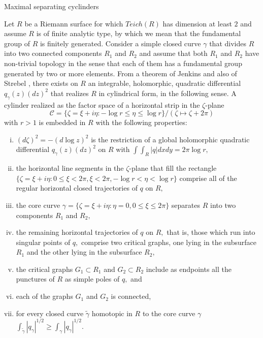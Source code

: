 \documentclass[12pt]{amsart}
\theoremstyle{remark}
\theoremstyle{definition}
\theoremstyle{definition}
\begin{document}
\begin{section}{Maximal separating cyclinders}\label{separating}

Let $R$ be a Riemann surface for which $Teich(R)$ has dimension at least $2$ and assume  $R$ is of finite analytic type, by which we mean that the fundamental group of $R$ is finitely generated.
Consider a simple closed curve $\gamma$  that divides $R$ into two connected components $R_1$ and $R_2$ and assume that both $R_1$ and $R_2$ have non-trivial topology in the sense that each of them has a fundamental group generated by two or more elements.
From a theorem of Jenkins \cite{Jenkins1} and also of Strebel \cite{Strebelbook}, there exists on $R$ an integrable, holomorphic, quadratic differential $q_{\gamma}(z)(dz)^2$ that realizes $R$ in cylindrical form, in the following sense.
A cylinder realized as the factor space of a horizontal strip in the $\zeta$-plane
 \begin{equation}\label{cylinder1} {\mathcal C} = \{\zeta=\xi + i\eta:  - \log r \leq \eta \leq \log r \}/ (\zeta \mapsto \zeta + 2 \pi)
 \end{equation}
  with $r>1$ is embedded in $R$ with the following properties:
\begin{enumerate}[i)]
\item{$(d \zeta)^2 = - (d \log z)^2$ is the restriction of a global holomorphic quadratic differential  $q_{\gamma}(z)(dz)^2$ on $R$ with $\int \int_R |q| dx dy = 2 \pi \log r,$ }
\item{the horizontal line segments in the $\zeta$-plane that fill the rectangle 
$\{\zeta=\xi + i\eta: 0 \leq \xi < 2 \pi,  \xi < 2 \pi, - \log r < \eta < \log r \}$
 comprise all of the regular horizontal closed trajectories of $q$ on $R,$ }
\item{the core curve $\gamma =\{\zeta=\xi + i\eta: \eta= 0, 0 \leq \xi \leq 2 \pi\}$ separates $R$ into two components $R_1$ and $R_2,$}
\item{the remaining horizontal trajectories of $q$ on $R,$ that is, those which run into singular points of $q,$ comprise two critical graphs, one lying in the subsurface $R_1$ and the other lying in the subsurface $R_2,$}
\item{the critical graphs $G_1 \subset R_1$ and $G_2 \subset R_2$ include as endpoints all the punctures of $R$ as simple poles of $q,$ and}
\item{each of the graphs $G_1$ and $G_2$ is connected,}
\item{for every closed curve $\tilde{\gamma}$  homotopic in $R$ to the core curve $\gamma$
$\int_{\tilde{\gamma} } |q_{\gamma}|^{1/2} \geq \int_{\gamma} |q_{\gamma}|
^{1/2}.$ }
\end{enumerate}


\end{section}
\end{document}
